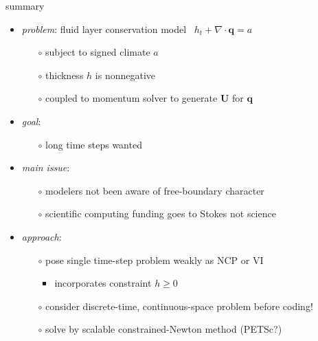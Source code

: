 \documentclass{beamer}
\newcommand\bq{\mathbf{q}}
\newcommand\bU{\mathbf{U}}
\newcommand\Div{\nabla\cdot}
\begin{document}
\begin{frame}{summary}

  \begin{itemize}
  \item \emph{problem}: fluid layer conservation model \, $h_t + \Div\bq = a$
    \begin{itemize}
    \item[$\circ$]  subject to signed climate $a$
    \item[$\circ$]  thickness $h$ is nonnegative
    \item[$\circ$]  coupled to momentum solver to generate $\bU$ for $\bq$
    \end{itemize}
  \item \emph{goal}:
    \begin{itemize}
    \item[$\circ$]  long time steps wanted
    \end{itemize}
  \item \emph{main issue}:
    \begin{itemize}
    \item[$\circ$]  modelers not been aware of free-boundary character
    \item[$\circ$]  scientific computing funding goes to Stokes not science
    \end{itemize}
  \item \emph{approach}:
    \begin{itemize}
    \item[$\circ$]  pose single time-step problem weakly as NCP or VI
      \begin{itemize}
      \item  incorporates constraint $h\ge 0$
      \end{itemize}
    \item[$\circ$]  consider discrete-time, continuous-space problem before coding!
    \item[$\circ$]  solve by scalable constrained-Newton method (PETSc?)
    \end{itemize}
  \end{itemize}

\end{frame}
\end{document}
